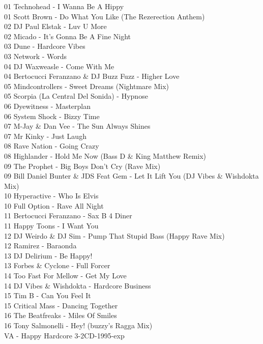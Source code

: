 \begin{multicols}{2}
 01 Technohead - I Wanna Be A Hippy\\ 01 Scott Brown - Do What You Like (The Rezerection Anthem)\\ 02 DJ Paul Elstak - Luv U More\\ 02 Micado - It's Gonna Be A Fine Night\\ 03 Dune - Hardcore Vibes\\ 03 Network - Words\\ 04 DJ Waxweasle - Come With Me\\ 04 Bertocucci Feranzano \& DJ Buzz Fuzz - Higher Love\\ 05 Mindcontrollers - Sweet Dreams (Nightmare Mix)\\ 05 Scorpia (La Central Del Sonida) - Hypnose\\ 06 Dyewitness - Masterplan\\ 06 System Shock - Bizzy Time\\ 07 M-Jay \& Dan Vee - The Sun Always Shines\\ 07 Mr Kinky - Just Laugh\\ 08 Rave Nation - Going Crazy\\ 08 Highlander - Hold Me Now (Bass D \& King Matthew Remix)\\ 09 The Prophet - Big Boys Don't Cry (Rave Mix)\\ 09 Bill Daniel Bunter \& JDS Feat Gem - Let It Lift You (DJ Vibes \& Wishdokta Mix)\\ 10 Hyperactive - Who Is Elvis\\ 10 Full Option - Rave All Night\\ 11 Bertocucci Feranzano - Sax B 4 Diner\\ 11 Happy Toons - I Want You\\ 12 DJ Weirdo \& DJ Sim - Pump That Stupid Bass (Happy Rave Mix)\\ 12 Ramirez - Baraonda\\ 13 DJ Delirium - Be Happy!\\ 13 Forbes \& Cyclone - Full Forcer\\ 14 Too Fast For Mellow - Get My Love\\ 14 DJ Vibes \& Wishdokta - Hardcore Business\\ 15 Tim B - Can You Feel It\\ 15 Critical Mass - Dancing Together\\ 16 The Beatfreaks - Miles Of Smiles\\ 16 Tony Salmonelli - Hey! (buzzy's Ragga Mix)\\
 \large VA - Happy Hardcore 3-2CD-1995-exp \normalsize\\

\end{multicols}
